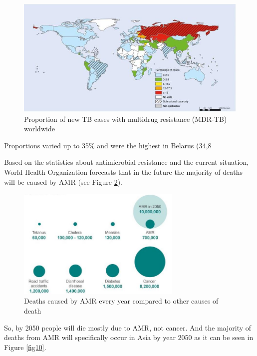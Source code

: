 \begin{figure}[H]
  \centering
  \includegraphics[width=\textwidth]{img/Fig8}
  \caption{Proportion of new TB cases with multidrug resistance (MDR-TB) worldwide}
  \label{fig8}
\end{figure}

Proportions varied up to 35\% and were the highest in Belarus (34,8%

Based on the statistics about antimicrobial resistance and the current situation, World Health Organization forecasts that in the future the majority of deaths will be caused by AMR (see Figure \ref{fig9}).

\begin{figure}[H]
  \centering
  \includegraphics[width=0.7\textwidth]{img/Fig9}
  \caption{Deaths caused by AMR every year compared to other causes of death}
  \label{fig9}
\end{figure}

So, by 2050 people will die mostly due to AMR, not cancer. And the majority of deaths from AMR will specifically occur in Asia by year 2050 as it can be seen in Figure \ref{fig10}.

